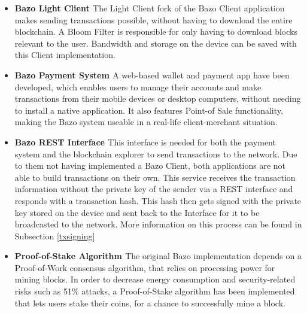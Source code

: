 \begin{itemize}
\item \textbf{Bazo Light Client \cite{marc}}
The Light Client fork of the Bazo Client application makes sending transactions possible, without having to download the entire blockchain. A Bloom Filter is responsible for only having to download blocks relevant to the user. Bandwidth and storage on the device can be saved with this Client implementation.
\item \textbf{Bazo Payment System \cite{payment}}
A web-based wallet and payment app have been developed, which enables users to manage their accounts and make transactions from their mobile devices or desktop computers, without needing to install a native application. It also features Point-of Sale functionality, making the Bazo system useable in a real-life client-merchant situation.
\item \textbf{Bazo REST Interface \cite{marc}}
This interface is needed for both the payment system and the blockchain explorer to send transactions to the network. Due to them not having implemented a Bazo Client, both applications are not able to build transactions on their own. This service receives the transaction information without the private key of the sender via a REST interface and responds with a transaction hash. This hash then gets signed with the private key stored on the device and sent back to the Interface for it to be broadcasted to the network. More information on this process can be found in Subsection \ref{txsigning}
\item \textbf{Proof-of-Stake Algorithm \cite{pos}}
The original Bazo implementation \cite{bazo} depends on a Proof-of-Work consensus algorithm, that relies on processing power for mining blocks. In order to decrease energy consumption and security-related risks such as 51\% attacks, a Proof-of-Stake algorithm has been implemented that lets users stake their coins, for a chance to successfully mine a block.
\end{itemize}

